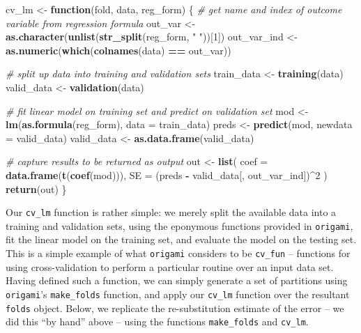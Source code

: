 \documentclass[12pt, krantz2,]{krantz}
\newenvironment{Shaded}{\begin{snugshade}}{\end{snugshade}}
\newcommand{\CommentTok}[1]{\textcolor[rgb]{0.37,0.37,0.37}{\textit{#1}}}
\newcommand{\ControlFlowTok}[1]{\textcolor[rgb]{0.27,0.27,0.27}{\textbf{#1}}}
\newcommand{\DataTypeTok}[1]{\textcolor[rgb]{0.27,0.27,0.27}{#1}}
\newcommand{\DecValTok}[1]{\textcolor[rgb]{0.06,0.06,0.06}{#1}}
\newcommand{\KeywordTok}[1]{\textcolor[rgb]{0.27,0.27,0.27}{\textbf{#1}}}
\newcommand{\NormalTok}[1]{#1}
\newcommand{\OperatorTok}[1]{\textcolor[rgb]{0.43,0.43,0.43}{\textbf{#1}}}
\newcommand{\StringTok}[1]{\textcolor[rgb]{0.5,0.5,0.5}{#1}}
\theoremstyle{definition}
\theoremstyle{definition}
\theoremstyle{definition}
\newcommand{\1}{\mathbbm{1}}
\begin{document}
\begin{Shaded}
\begin{Highlighting}[]
\NormalTok{cv_lm <-}\StringTok{ }\ControlFlowTok{function}\NormalTok{(fold, data, reg_form) \{}
  \CommentTok{# get name and index of outcome variable from regression formula}
\NormalTok{  out_var <-}\StringTok{ }\KeywordTok{as.character}\NormalTok{(}\KeywordTok{unlist}\NormalTok{(}\KeywordTok{str_split}\NormalTok{(reg_form, }\StringTok{" "}\NormalTok{))[}\DecValTok{1}\NormalTok{])}
\NormalTok{  out_var_ind <-}\StringTok{ }\KeywordTok{as.numeric}\NormalTok{(}\KeywordTok{which}\NormalTok{(}\KeywordTok{colnames}\NormalTok{(data) }\OperatorTok{==}\StringTok{ }\NormalTok{out_var))}

  \CommentTok{# split up data into training and validation sets}
\NormalTok{  train_data <-}\StringTok{ }\KeywordTok{training}\NormalTok{(data)}
\NormalTok{  valid_data <-}\StringTok{ }\KeywordTok{validation}\NormalTok{(data)}

  \CommentTok{# fit linear model on training set and predict on validation set}
\NormalTok{  mod <-}\StringTok{ }\KeywordTok{lm}\NormalTok{(}\KeywordTok{as.formula}\NormalTok{(reg_form), }\DataTypeTok{data =}\NormalTok{ train_data)}
\NormalTok{  preds <-}\StringTok{ }\KeywordTok{predict}\NormalTok{(mod, }\DataTypeTok{newdata =}\NormalTok{ valid_data)}
\NormalTok{  valid_data <-}\StringTok{ }\KeywordTok{as.data.frame}\NormalTok{(valid_data)}

  \CommentTok{# capture results to be returned as output}
\NormalTok{  out <-}\StringTok{ }\KeywordTok{list}\NormalTok{(}
    \DataTypeTok{coef =} \KeywordTok{data.frame}\NormalTok{(}\KeywordTok{t}\NormalTok{(}\KeywordTok{coef}\NormalTok{(mod))),}
    \DataTypeTok{SE =}\NormalTok{ (preds }\OperatorTok{-}\StringTok{ }\NormalTok{valid_data[, out_var_ind])}\OperatorTok{^}\DecValTok{2}
\NormalTok{  )}
  \KeywordTok{return}\NormalTok{(out)}
\NormalTok{\}}
\end{Highlighting}
\end{Shaded}

Our \texttt{cv\_lm} function is rather simple: we merely split the available data into a
training and validation sets, using the eponymous functions provided in
\texttt{origami}, fit the linear model on the training set, and evaluate the model on
the testing set. This is a simple example of what \texttt{origami} considers to be
\texttt{cv\_fun} -- functions for using cross-validation to perform a particular routine
over an input data set. Having defined such a function, we can simply generate a
set of partitions using \texttt{origami}'s \texttt{make\_folds} function, and apply our \texttt{cv\_lm}
function over the resultant \texttt{folds} object. Below, we replicate the
re-substitution estimate of the error -- we did this ``by hand'' above -- using
the functions \texttt{make\_folds} and \texttt{cv\_lm}.
\end{document}
